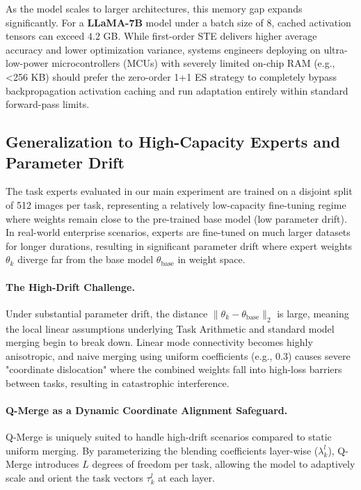 As the model scales to larger architectures, this memory gap expands significantly. For a \textbf{LLaMA-7B} model under a batch size of 8, cached activation tensors can exceed $4.2$ GB. While first-order STE delivers higher average accuracy and lower optimization variance, systems engineers deploying on ultra-low-power microcontrollers (MCUs) with severely limited on-chip RAM (e.g., <256 KB) should prefer the zero-order 1+1 ES strategy to completely bypass backpropagation activation caching and run adaptation entirely within standard forward-pass limits.

\subsection{Generalization to High-Capacity Experts and Parameter Drift}
\label{subsec:high_capacity_drift}

The task experts evaluated in our main experiment are trained on a disjoint split of 512 images per task, representing a relatively low-capacity fine-tuning regime where weights remain close to the pre-trained base model (low parameter drift). In real-world enterprise scenarios, experts are fine-tuned on much larger datasets for longer durations, resulting in significant parameter drift where expert weights $\theta_k$ diverge far from the base model $\theta_{\text{base}}$ in weight space.

\paragraph{The High-Drift Challenge.}
Under substantial parameter drift, the distance $\|\theta_k - \theta_{\text{base}}\|_2$ is large, meaning the local linear assumptions underlying Task Arithmetic and standard model merging begin to break down. Linear mode connectivity becomes highly anisotropic, and naive merging using uniform coefficients (e.g., $0.3$) causes severe "coordinate dislocation" where the combined weights fall into high-loss barriers between tasks, resulting in catastrophic interference.

\paragraph{Q-Merge as a Dynamic Coordinate Alignment Safeguard.}
Q-Merge is uniquely suited to handle high-drift scenarios compared to static uniform merging. By parameterizing the blending coefficients layer-wise ($\lambda^l_k$), Q-Merge introduces $L$ degrees of freedom per task, allowing the model to adaptively scale and orient the task vectors $\tau^l_k$ at each layer. 

